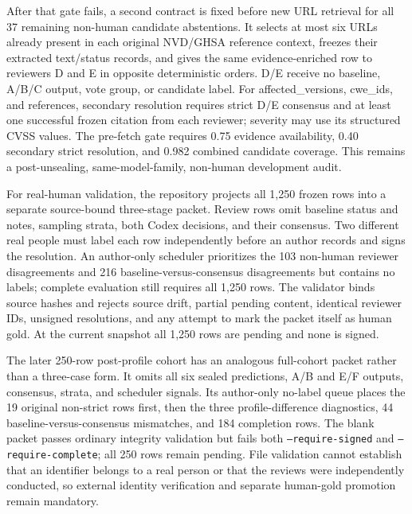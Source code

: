After that gate fails, a second contract is fixed before new URL retrieval for all 37 remaining non-human candidate abstentions. It selects at most six URLs already present in each original NVD/GHSA reference context, freezes their extracted text/status records, and gives the same evidence-enriched row to reviewers D and E in opposite deterministic orders. D/E receive no baseline, A/B/C output, vote group, or candidate label. For affected\_versions, cwe\_ids, and references, secondary resolution requires strict D/E consensus and at least one successful frozen citation from each reviewer; severity may use its structured CVSS values. The pre-fetch gate requires 0.75 evidence availability, 0.40 secondary strict resolution, and 0.982 combined candidate coverage. This remains a post-unsealing, same-model-family, non-human development audit.

For real-human validation, the repository projects all 1,250 frozen rows into a separate source-bound three-stage packet. Review rows omit baseline status and notes, sampling strata, both Codex decisions, and their consensus. Two different real people must label each row independently before an author records and signs the resolution. An author-only scheduler prioritizes the 103 non-human reviewer disagreements and 216 baseline-versus-consensus disagreements but contains no labels; complete evaluation still requires all 1,250 rows. The validator binds source hashes and rejects source drift, partial pending content, identical reviewer IDs, unsigned resolutions, and any attempt to mark the packet itself as human gold. At the current snapshot all 1,250 rows are pending and none is signed.

The later 250-row post-profile cohort has an analogous full-cohort packet rather than a three-case form. It omits all six sealed predictions, A/B and E/F outputs, consensus, strata, and scheduler signals. Its author-only no-label queue places the 19 original non-strict rows first, then the three profile-difference diagnostics, 44 baseline-versus-consensus mismatches, and 184 completion rows. The blank packet passes ordinary integrity validation but fails both \texttt{--require-signed} and \texttt{--require-complete}; all 250 rows remain pending. File validation cannot establish that an identifier belongs to a real person or that the reviews were independently conducted, so external identity verification and separate human-gold promotion remain mandatory.

